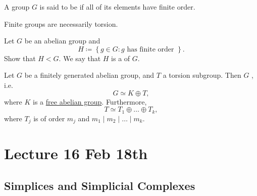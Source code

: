 \documentclass[notoc,notitlepage]{tufte-book}
\begin{document}
\begin{defn}\label{defn:torsion_group}
  A group $G$ is said to be  if all of its elements have finite
  order.
\end{defn}

\begin{eg}
  Finite groups are necessarily torsion.
\end{eg}

\begin{ex}
  Let $G$ be an abelian group and
  \begin{equation*}
    H \coloneqq \left\{ g \in G : g \text{ has finite order } \right\}.
  \end{equation*}
  Show that $H < G$. We say that $H$ is a  of $G$.
\end{ex}

\begin{thm}\label{thm:fundamental_theorem_of_finitely_generated_abelian_groups}
  Let $G$ be a finitely generated abelian group, and $T$ a torsion subgroup.
  Then $G$ , i.e.
  \begin{equation*}
    G \simeq K \oplus T,
  \end{equation*}
  where $K$ is a \hyperref[defn:free_abelian_groups]{free abelian group}.
  Furthermore,
  \begin{equation*}
    T \simeq T_1 \oplus \hdots \oplus T_k,
  \end{equation*}
  where $T_j$ is of order $m_j$ and $m_1 \mid m_2 \mid \hdots \mid m_k$.
\end{thm}




\chapter{Lecture 16 Feb 18th}%
\label{chp:lecture_16_feb_18th}

\section{Simplices and Simplicial Complexes}%
\label{sec:simplices_and_simplicial_complexes}
\end{document}
